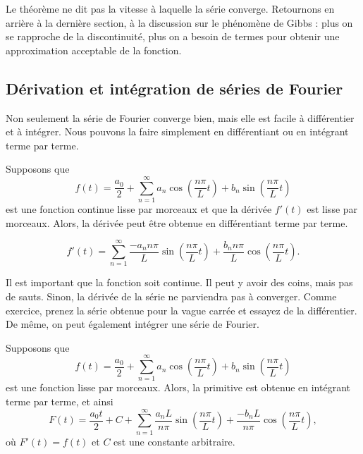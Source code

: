 Le théorème ne dit pas la vitesse à laquelle la série converge. Retournons en arrière à la dernière section, à la discussion sur le phénomène de Gibbs : plus on se rapproche de la discontinuité, plus on a besoin de termes pour obtenir une approximation acceptable de la fonction.

\subsection{Dérivation et intégration de séries de Fourier}

Non seulement la série de Fourier converge bien, mais elle est facile à différentier
et à intégrer. Nous pouvons la faire simplement en différentiant ou en intégrant terme par terme.

\begin{theorem}
Supposons que
\begin{equation*}
f(t) = \frac{a_0}{2} + \sum_{n=1}^\infty a_n \cos \left( \frac{n \pi}{L} t
\right)
+ b_n \sin \left( \frac{n \pi}{L} t \right)
\end{equation*}
est une fonction continue lisse par morceaux et que la dérivée $f'(t)$ est  lisse
par morceaux. Alors, la dérivée peut être obtenue en différentiant terme par terme.

\begin{equation*}
f'(t) = \sum_{n=1}^\infty \frac{-a_n n \pi}{L} 
\sin \left( \frac{n \pi}{L} t \right)
+ \frac{b_n n \pi}{L} \cos \left( \frac{n \pi}{L} t \right) .
\end{equation*}
\end{theorem}

Il est important que la fonction soit continue. Il peut y avoir des coins, mais pas de sauts. Sinon, la dérivée de la série ne parviendra pas à converger. Comme 
exercice, prenez la série obtenue pour la vague carrée et essayez de la
différentier. De même, on peut également intégrer une série de Fourier.

\begin{theorem}
Supposons que
\begin{equation*}
f(t) = \frac{a_0}{2} + \sum_{n=1}^\infty
a_n \cos \left( \frac{n \pi}{L} t \right)
+ b_n \sin \left( \frac{n \pi}{L} t \right)
\end{equation*}
est une fonction lisse par morceaux. Alors, la primitive est obtenue en intégrant terme par terme, et ainsi
\begin{equation*}
F(t) = \frac{a_0 t}{2} + C + \sum_{n=1}^\infty
\frac{a_n L}{n \pi} \sin \left( \frac{n \pi}{L} t \right)
+ \frac{-b_n L}{n \pi}  \cos \left( \frac{n \pi}{L} t \right) ,
\end{equation*}
où $F'(t) = f(t)$ et $C$ est une constante arbitraire. 
\end{theorem}

